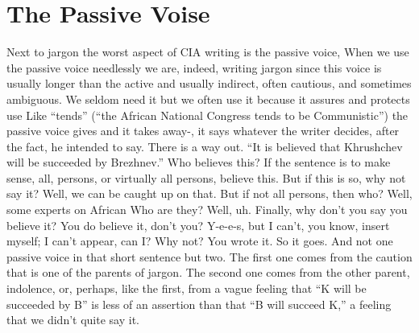 \documentclass[
    oneside,
    11pt,
    draft
]{memoir}
\begin{document}
\chapter{The Passive Voise}

Next to jargon the worst aspect of CIA writing is the passive voice, When we use the passive voice needlessly we are, indeed, writing jargon since this voice is usually longer than the active and usually indirect, often cautious, and sometimes ambiguous. We seldom need it but we often use it because it assures and protects use Like \enquote{tends} (\enquote{the African National Congress tends to be Communistic}) the passive voice gives and it takes away-, it says whatever the writer decides, after the fact, he intended to say. There is a way out. \enquote{It is believed that Khrushchev will be succeeded by Brezhnev.} Who believes this? If the sentence is to make sense, all, persons, or virtually all persons, believe this. But if this is so, why not say it? Well, we can be caught up on that. But if not all persons, then who? Well, some experts on African Who are they? Well, uh. Finally, why don't you say you believe it? You do believe it, don't you? Y-e-e-s, but I can't, you know, insert myself; I can't appear, can I? Why not? You wrote it. So it goes. And not one passive voice in that short sentence but two. The first one comes from the caution that is one of the parents of jargon. The second one comes from the other parent, indolence, or, perhaps, like the first, from a vague feeling that \enquote{K will be succeeded by B} is less of an assertion than that \enquote{B will succeed K,} a feeling that we didn't quite say it.
\end{document}
